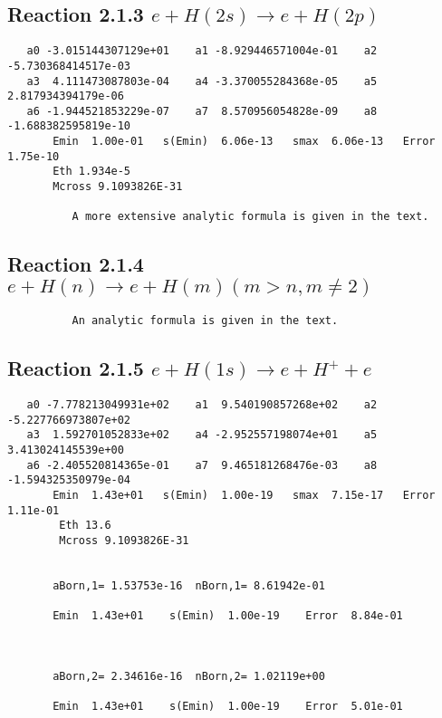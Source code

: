 \documentclass[12pt,dvipdfm]{article}
\begin{document}
\newpage
\subsection{
Reaction 2.1.3 $   e + H(2s) \rightarrow e + H(2p)$}


\begin{small}\begin{verbatim}
   a0 -3.015144307129e+01    a1 -8.929446571004e-01    a2 -5.730368414517e-03
   a3  4.111473087803e-04    a4 -3.370055284368e-05    a5  2.817934394179e-06
   a6 -1.944521853229e-07    a7  8.570956054828e-09    a8 -1.688382595819e-10
       Emin  1.00e-01   s(Emin)  6.06e-13   smax  6.06e-13   Error  1.75e-10
       Eth 1.934e-5
       Mcross 9.1093826E-31

          A more extensive analytic formula is given in the text.
\end{verbatim}\end{small}




\newpage
\subsection{
Reaction 2.1.4 $   e + H(n) \rightarrow e + H(m)  (m > n, m \neq 2)$}

\begin{small}\begin{verbatim}
          An analytic formula is given in the text.
\end{verbatim}\end{small}




\newpage
\subsection{
Reaction 2.1.5 $   e + H(1s) \rightarrow e + H^+ + e$}



\begin{small}\begin{verbatim}
   a0 -7.778213049931e+02    a1  9.540190857268e+02    a2 -5.227766973807e+02
   a3  1.592701052833e+02    a4 -2.952557198074e+01    a5  3.413024145539e+00
   a6 -2.405520814365e-01    a7  9.465181268476e-03    a8 -1.594325350979e-04
       Emin  1.43e+01   s(Emin)  1.00e-19   smax  7.15e-17   Error  1.11e-01
        Eth 13.6
        Mcross 9.1093826E-31


       aBorn,1= 1.53753e-16  nBorn,1= 8.61942e-01

       Emin  1.43e+01    s(Emin)  1.00e-19    Error  8.84e-01



       aBorn,2= 2.34616e-16  nBorn,2= 1.02119e+00

       Emin  1.43e+01    s(Emin)  1.00e-19    Error  5.01e-01

\end{verbatim}\end{small}
\end{document}
